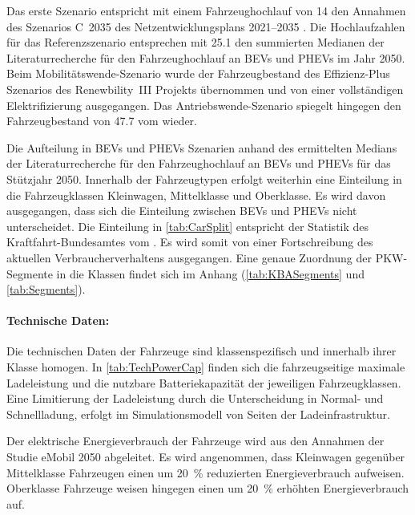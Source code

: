 Das erste Szenario entspricht mit einem Fahrzeughochlauf von \SI{14}{\MioStk} den Annahmen des Szenarios C~\num{2035} des Netzentwicklungsplans \numrange[range-phrase=~{--}~]{2021}{2035} \cite{BNetzA2020}.
Die Hochlaufzahlen für das Referenzszenario entsprechen mit \SI{25.1}{\MioStk} den summierten Medianen der Literaturrecherche für den Fahrzeughochlauf an \glspl{BEV} und \glspl{PHEV} im Jahr \num{2050}.
Beim Mobilitätswende-Szenario wurde der Fahrzeugbestand des Effizienz-Plus Szenarios des Renewbility~III Projekts \cite{Institut2016} übernommen und von einer vollständigen Elektrifizierung ausgegangen.
Das Antriebswende-Szenario spiegelt hingegen den Fahrzeugbestand von \SI{47.7}{\MioStk} vom  \cite{KBA2020} wieder.



Die Aufteilung in \glspl{BEV} und \glspl{PHEV} Szenarien anhand des ermittelten Medians der Literaturrecherche für den Fahrzeughochlauf an \glspl{BEV} und \glspl{PHEV} für das Stützjahr \num{2050}.
Innerhalb der Fahrzeugtypen erfolgt weiterhin eine Einteilung in die Fahrzeugklassen Kleinwagen, Mittelklasse und Oberklasse.
Es wird davon ausgegangen, dass sich die Einteilung zwischen \glspl{BEV} und \glspl{PHEV} nicht unterscheidet.
Die Einteilung in \autoref{tab:CarSplit} entspricht der Statistik des Kraftfahrt-Bundesamtes \cite{KBASegments2020} vom .
Es wird somit von einer Fortschreibung des aktuellen Verbraucherverhaltens ausgegangen.
Eine genaue Zuordnung der \gls{PKW}-Segmente in die Klassen findet sich im Anhang (\autoref{tab:KBASegments} und \autoref{tab:Segments}).



\paragraph{Technische Daten:}

Die technischen Daten der Fahrzeuge sind klassenspezifisch und innerhalb ihrer Klasse homogen.
In \autoref{tab:TechPowerCap} finden sich die fahrzeugseitige maximale Ladeleistung und die nutzbare Batteriekapazität der jeweiligen Fahrzeugklassen.
Eine Limitierung der Ladeleistung durch die Unterscheidung in Normal- und Schnellladung, erfolgt im Simulationsmodell von Seiten der Ladeinfrastruktur.



Der elektrische Energieverbrauch der Fahrzeuge wird aus den Annahmen der Studie \glqq eMobil \num{2050}\grqq{} \cite{Hacker2014} abgeleitet.
Es wird angenommen, dass Kleinwagen gegenüber Mittelklasse Fahrzeugen einen um \SI{20}{\percent} reduzierten Energieverbrauch aufweisen.
Oberklasse Fahrzeuge weisen hingegen einen um \SI{20}{\percent} erhöhten Energieverbrauch auf.\medskip


